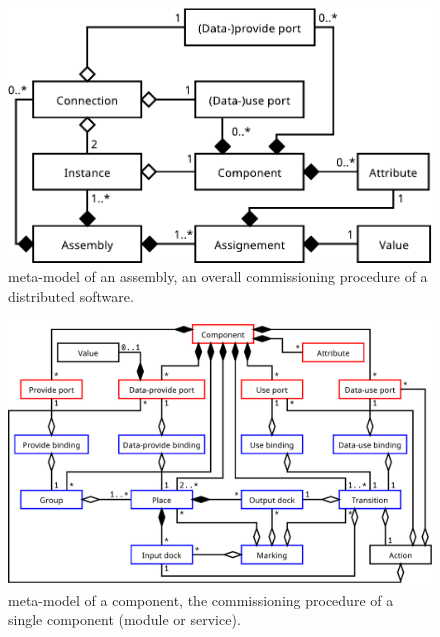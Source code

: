 \begin{figure}[tbp]
  \begin{center}
    \includegraphics[width=0.9\linewidth]{./images/ass_uml.pdf}
  \end{center}
  \caption{\mad meta-model of an assembly, \ie an overall
    commissioning procedure of a distributed software.}
  \label{fig:mmass}
\end{figure}


\begin{figure}[tbp]
  \begin{center}
    \includegraphics[width=0.9\linewidth]{./images/component_uml.pdf}
  \end{center}
  \caption{\mad meta-model of a component, \ie the commissioning
    procedure of a single component (\ie module or service).}
  \label{fig:mmcomp}
\end{figure}

